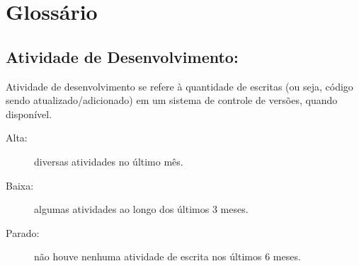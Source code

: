 \section{Glossário}

\subsection{Atividade de Desenvolvimento:}
Atividade de desenvolvimento se refere à quantidade de escritas (ou seja, código sendo atualizado/adicionado) em um sistema de controle de versões, quando disponível.

\begin{description}
	\item[Alta:] diversas atividades no último mês.
	\item[Baixa:] algumas atividades ao longo dos últimos 3 meses.
	\item[Parado:] não houve nenhuma atividade de escrita nos últimos 6 meses.
\end{description}
